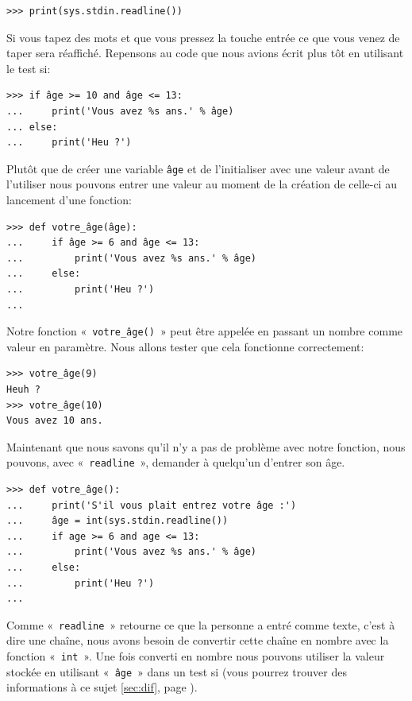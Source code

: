 \begin{Verbatim}[frame=single,rulecolor=\color{mbleu}, label=à taper]
>>> print(sys.stdin.readline())
\end{Verbatim}

Si vous tapez des mots et que vous pressez la touche entrée ce que vous venez de taper sera réaffiché. Repensons au code que nous avions écrit plus tôt en utilisant le test si:

\begin{Verbatim}[frame=single,rulecolor=\color{gray}, label=ne pas saisir]
>>> if âge >= 10 and âge <= 13:
...     print('Vous avez %s ans.' % âge)
... else:
...     print('Heu ?')
\end{Verbatim}

Plutôt que de créer une variable \texttt{âge} et de l'initialiser avec une valeur avant de l'utiliser nous pouvons  entrer une valeur au moment de la création de celle-ci au lancement d'une fonction:

\begin{Verbatim}[frame=single,rulecolor=\color{mbleu}, label=à taper]
>>> def votre_âge(âge):
...     if âge >= 6 and âge <= 13:
...         print('Vous avez %s ans.' % âge)
...     else:
...         print('Heu ?')
...
\end{Verbatim}

Notre fonction «~\texttt{votre\_âge()}~» peut être appelée en passant un nombre comme valeur en paramètre. Nous allons tester que cela fonctionne correctement: 

\begin{Verbatim}[frame=single,rulecolor=\color{mbleu}, label=à taper]
>>> votre_âge(9)
Heuh ?
>>> votre_âge(10)
Vous avez 10 ans.
\end{Verbatim}

Maintenant que nous savons qu'il n'y a pas de problème avec notre fonction, nous pouvons,
avec «~\texttt{readline}~», demander à quelqu'un d'entrer son âge.


\begin{Verbatim}[frame=single,rulecolor=\color{mbleu}, label=à taper]
>>> def votre_âge():
...     print('S'il vous plait entrez votre âge :')
...     âge = int(sys.stdin.readline())
...     if age >= 6 and age <= 13:
...         print('Vous avez %s ans.' % âge)
...     else:
...         print('Heu ?')
...
\end{Verbatim}

Comme «~\texttt{readline}~» retourne ce que la personne a entré comme texte, c'est à dire une chaîne, nous avons besoin de convertir cette chaîne en nombre avec la fonction «~\texttt{int}~». Une fois converti en nombre nous pouvons utiliser la valeur stockée en utilisant «~\texttt{âge}~» dans un test si (vous pourrez trouver des informations à ce sujet \autoref{sec:dif}, page \pageref{sec:dif}).

